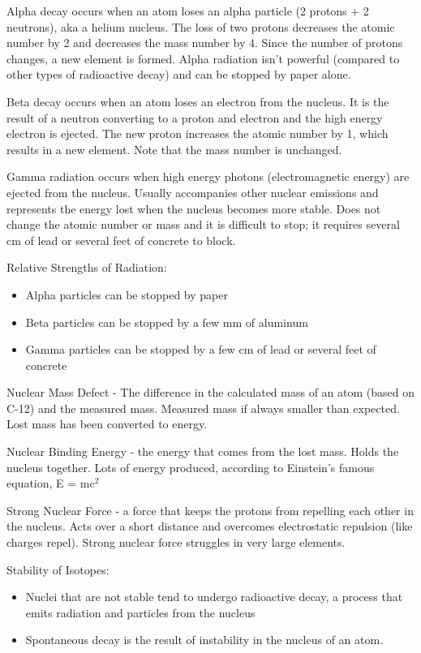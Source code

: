 \documentclass[../hchem.tex]{subfiles}
\begin{document}
Alpha decay occurs when an atom loses an alpha particle (2 protons + 2 neutrons), aka a helium nucleus. The loss of two protons decreases the atomic number by 2
and decreases the mass number by 4. Since the number of protons changes, a new element is formed. Alpha radiation isn't powerful (compared to other types of radioactive decay)
and can be stopped by paper alone.

Beta decay occurs when an atom loses an electron from the nucleus. It is the result of a neutron converting to a proton and electron and the high energy electron is ejected.
The new proton increases the atomic number by 1, which results in a new element. Note that the mass number is unchanged.

Gamma radiation occurs when high energy photons (electromagnetic energy) are ejected from the nucleus.
Usually accompanies other nuclear emissions and represents the energy lost when the nucleus becomes more stable. Does not change the atomic 
number or mass and it is difficult to stop; it requires several cm of lead or several feet of concrete to block.

Relative Strengths of Radiation:
\begin{itemize}
    \item Alpha particles can be stopped by paper 
    \item Beta particles can be stopped by a few mm of aluminum 
    \item Gamma particles can be stopped by a few cm of lead or several feet of concrete 
\end{itemize}

Nuclear Mass Defect - The difference in the calculated mass of an atom (based on C-12) and the measured mass.
Measured mass if always smaller than expected. Lost mass has been converted to energy.

Nuclear Binding Energy - the energy that comes from the lost mass. Holds the nucleus together. Lots of energy produced, according to Einstein's famous equation, E = mc$^2$

Strong Nuclear Force - a force that keeps the protons from repelling each other in the nucleus. Acts over a short distance and overcomes electrostatic repulsion (like charges repel). Strong nuclear force struggles in very large elements.

Stability of Isotopes:
\begin{itemize}
    \item Nuclei that are not stable tend to undergo radioactive decay, a process that emits radiation and particles from the nucleus 
    \item Spontaneous decay is the result of instability in the nucleus of an atom.
\end{itemize}
\end{document}

